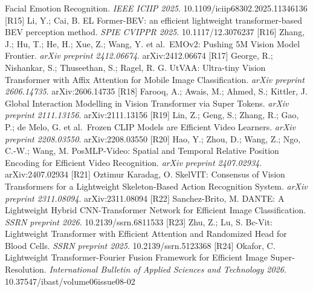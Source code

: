 \documentclass[
  chinese,
]{article}
\begin{document}
Facial Emotion Recognition. \emph{IEEE ICIIP 2025}.
10.1109/iciip68302.2025.11346136 {[}R15{]} Li, Y.; Cai, B. EL
Former-BEV: an efficient lightweight transformer-based BEV perception
method. \emph{SPIE CVIPPR 2025}. 10.1117/12.3076237 {[}R16{]} Zhang, J.;
Hu, T.; He, H.; Xue, Z.; Wang, Y. et al.~EMOv2: Pushing 5M Vision Model
Frontier. \emph{arXiv preprint 2412.06674}. arXiv:2412.06674 {[}R17{]}
George, R.; Nishankar, S.; Thuseethan, S.; Ragel, R. G. UtVAA:
Ultra-tiny Vision Transformer with Affix Attention for Mobile Image
Classification. \emph{arXiv preprint 2606.14735}. arXiv:2606.14735
{[}R18{]} Farooq, A.; Awais, M.; Ahmed, S.; Kittler, J. Global
Interaction Modelling in Vision Transformer via Super Tokens.
\emph{arXiv preprint 2111.13156}. arXiv:2111.13156 {[}R19{]} Lin, Z.;
Geng, S.; Zhang, R.; Gao, P.; de Melo, G. et al.~Frozen CLIP Models are
Efficient Video Learners. \emph{arXiv preprint 2208.03550}.
arXiv:2208.03550 {[}R20{]} Hao, Y.; Zhou, D.; Wang, Z.; Ngo, C.-W.;
Wang, M. PosMLP-Video: Spatial and Temporal Relative Position Encoding
for Efficient Video Recognition. \emph{arXiv preprint 2407.02934}.
arXiv:2407.02934 {[}R21{]} Oztimur Karadag, O. SkelVIT: Consensus of
Vision Transformers for a Lightweight Skeleton-Based Action Recognition
System. \emph{arXiv preprint 2311.08094}. arXiv:2311.08094 {[}R22{]}
Sanchez-Brito, M. DANTE: A Lightweight Hybrid CNN-Transformer Network
for Efficient Image Classification. \emph{SSRN preprint 2026}.
10.2139/ssrn.6811533 {[}R23{]} Zhu, Z.; Lu, S. Bc-Vit: Lightweight
Transformer with Efficient Attention and Randomized Head for Blood
Cells. \emph{SSRN preprint 2025}. 10.2139/ssrn.5123368 {[}R24{]} Okafor,
C. Lightweight Transformer-Fourier Fusion Framework for Efficient Image
Super-Resolution. \emph{International Bulletin of Applied Sciences and
Technology 2026}. 10.37547/ibast/volume06issue08-02
\end{document}
